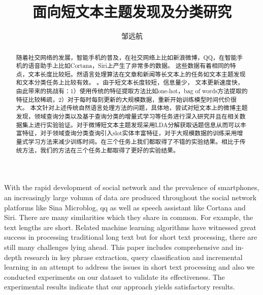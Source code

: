 \documentclass[master]{njuthesis}
\title{面向短文本主题发现及分类研究}
\author{邹远航}
\institute{南京大学}
\begin{document}

\makenlctitle
\maketitle
\makeenglishtitle


\frontmatter

\begin{abstract}
随着社交网络的发展，智能手机的普及，在社交网络上比如新浪微博，QQ，在智能手机的语音助手上比如Cortana，Siri上产生了非常多的数据。
这些数据有着相同的特点，文本长度比较短。然语言处理算法在文章和新闻等长文本上的任务如文本主题发现和文本分类任务上比较有效。
。由于短文本长度较短，信息量少， 文本更新速度快，由此带来的挑战有：1）使用传统的特征提取方法比如one-hot，bag of words方法提取的特征比较稀疏，2）对于每时每刻更新的大规模数据，重新开始训练模型时间代价很大。
本文针对上述传统自然语言处理方法的问题，具体地，尝试对短文本上的微博主题发现，领域查询分类以及基于查询分类的增量式学习等任务进行深入研究并且在相关数据集上进行实验验证。对于微博短文本主题发现采用LDA分解获取话题信息从而可以丰富特征，对于领域查询分类查询引入slot实体丰富特征，对于大规模数据的训练采用增量式学习方法来减少训练时间。在三个任务上我们都取得了不错的实验结果。相比于传统方法，我们的方法在三个任务上都取得了更好的实验结果。

\end{abstract}

\begin{englishabstract}
With the rapid development of social network and the prevalence of smartphones, an increasingly large volumn of data are produced throughout the social network platforms like Sina Microblog, qq as well as speech assistant like Cortana and Siri. There are many similarities which they share in common. For example, the text lengths are short. Related machine learning algorithms have witnessed great success in processing traditional long text but for short text processing, there are still many challenges lying ahead. This paper includes comprehensive and in-depth research in key phrase extraction, query classification and incremental learning in an attempt to address the issues in short text processing and also we conducted experiments on our dataset to validate its effectiveness. The experimental results indicate that our approach yields satisfactory results.  

\end{englishabstract}
\end{document}
